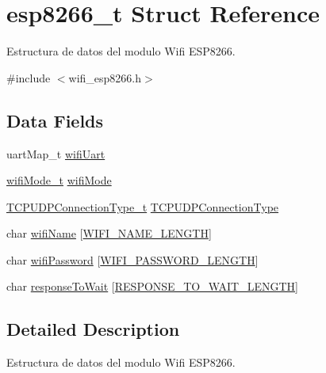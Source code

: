 \hypertarget{structesp8266__t}{}\section{esp8266\+\_\+t Struct Reference}
\label{structesp8266__t}


Estructura de datos del modulo Wifi E\+S\+P8266.  




{\ttfamily \#include $<$wifi\+\_\+esp8266.\+h$>$}

\subsection*{Data Fields}
\begin{DoxyCompactItemize}
\item 
uart\+Map\+\_\+t \hyperlink{structesp8266__t_abc2b749b32780c2d476d3968c984d0a8}{wifi\+Uart}
\item 
\hyperlink{wifi__esp8266_8h_a644a98aa74e43b8bdd1504310cee345e}{wifi\+Mode\+\_\+t} \hyperlink{structesp8266__t_adf5f5479a30aad5ab054133aa68f5184}{wifi\+Mode}
\item 
\hyperlink{wifi__esp8266_8h_a0a56b4d7d7b4327ac6f171aa63c6bcbc}{T\+C\+P\+U\+D\+P\+Connection\+Type\+\_\+t} \hyperlink{structesp8266__t_a673d2888e6c5818cfbb2f1688cde2333}{T\+C\+P\+U\+D\+P\+Connection\+Type}
\item 
char \hyperlink{structesp8266__t_a1a70381e7e2b5613e995bdca52d381f1}{wifi\+Name} \mbox{[}\hyperlink{wifi__esp8266_8h_aa3bfe9f30edbb5fac0a774a810c45bd4}{W\+I\+F\+I\+\_\+\+N\+A\+M\+E\+\_\+\+L\+E\+N\+G\+TH}\mbox{]}
\item 
char \hyperlink{structesp8266__t_ad9b7f490ac9888aabd0b0b3a78e0dcfe}{wifi\+Password} \mbox{[}\hyperlink{wifi__esp8266_8h_ac7c70f898113fc416cd50088eb8def4b}{W\+I\+F\+I\+\_\+\+P\+A\+S\+S\+W\+O\+R\+D\+\_\+\+L\+E\+N\+G\+TH}\mbox{]}
\item 
char \hyperlink{structesp8266__t_a8c564dbf94d8d2f758fdc92d5c4dc4e6}{response\+To\+Wait} \mbox{[}\hyperlink{wifi__esp8266_8h_ad15d1691bb7dd8541f8f14974e5a94c6}{R\+E\+S\+P\+O\+N\+S\+E\+\_\+\+T\+O\+\_\+\+W\+A\+I\+T\+\_\+\+L\+E\+N\+G\+TH}\mbox{]}
\end{DoxyCompactItemize}


\subsection{Detailed Description}
Estructura de datos del modulo Wifi E\+S\+P8266. 

